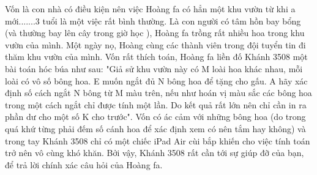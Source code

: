 Vốn là con nhà có điều kiện nên việc Hoàng fa có hẳn một khu vườn từ khi a mới.......3 tuổi là một việc rất bình thường. Là con người có tâm hồn bay bổng (và thường bay lên cây trong giờ học ), Hoàng fa trồng rất nhiều hoa trong khu vườn của mình. Một ngày nọ, Hoàng cùng các thành viên trong đội tuyển tin đi thăm khu vườn của mình. Vốn rất thích toán, Hoàng fa liền đố Khánh 3508 một bài toán hóc búa như sau: "Giả sử khu vườn này có M loài hoa khác nhau, mỗi loài có vô số bông hoa. E muốn ngắt đủ N bông hoa để tặng cho gấu. A hãy xác định số cách ngắt N bông từ M màu trên, nếu như hoán vị màu sắc các bông hoa trong một cách ngắt chỉ được tính một lần. Do kết quả rất lớn nên chỉ cần in ra phần dư cho một số K cho trước". Vốn có ác cảm với những bông hoa (do trong quá khứ từng phải đếm số cánh hoa để xác định xem có nên tắm hay không) và trong tay Khánh 3508 chỉ có một chiếc iPad Air cùi bắp khiến cho việc tính toán trở nên vô cùng khó khăn. Bởi vậy, Khánh 3508 rất cần tới sự giúp đỡ của bạn, để trả lời chính xác câu hỏi của Hoàng fa.